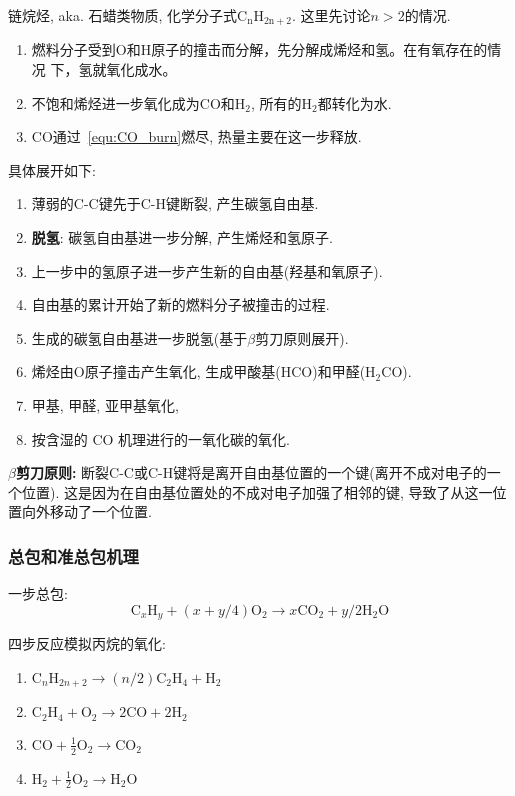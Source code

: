 链烷烃, aka. 石蜡类物质, 化学分子式\(\mathrm{C_n H_{2n+2}}\). 这里先讨论\(n>2\)的情况.
\begin{enumerate}
    \item  燃料分子受到O和H原子的撞击而分解，先分解成烯烃和氢。在有氧存在的情况
下，氢就氧化成水。
    \item 不饱和烯烃进一步氧化成为CO和\(\mathrm{H_2}\), 所有的\(\mathrm{H_2}\)都转化为水.
    \item CO通过~\ref{equ:CO_burn}燃尽, 热量主要在这一步释放.
\end{enumerate}

具体展开如下:
\begin{enumerate}
    \item 薄弱的C-C键先于C-H键断裂, 产生碳氢自由基.
    \item \textbf{脱氢}: 碳氢自由基进一步分解, 产生烯烃和氢原子.
    \item 上一步中的氢原子进一步产生新的自由基(羟基和氧原子).
    \item 自由基的累计开始了新的燃料分子被撞击的过程.
    \item 生成的碳氢自由基进一步脱氢(基于\(\beta\)剪刀原则展开).
    \item 烯烃由O原子撞击产生氧化, 生成甲酸基(HCO)和甲醛(H\(_2\)CO).
    \item 甲基, 甲醛, 亚甲基氧化,
    \item 按含湿的 CO 机理进行的一氧化碳的氧化.
\end{enumerate}

\textbf{\(\beta\)剪刀原则:} 断裂C-C或C-H键将是离开自由基位置的一个键(离开不成对电子的一个位置). 这是因为在自由基位置处的不成对电子加强了相邻的键, 导致了从这一位置向外移动了一个位置.

\subsubsection{总包和准总包机理}

一步总包:
\begin{equation}
    \mathrm{C}_x \mathrm{H}_y + (x+y/4)\mathrm{O_2} \to x\mathrm{CO_2} + y/2\mathrm{H_2O}
\end{equation}

四步反应模拟丙烷的氧化:
\begin{enumerate}
    \item \(\mathrm{C}_n \mathrm{H}_{2n+2} \to (n/2) \mathrm{C}_2 \mathrm{H}_4 + \mathrm{H}_2\)
    \item \(\mathrm{C}_2\mathrm{H}_4 + \mathrm{O}_2 \to 2\mathrm{CO} + 2 \mathrm{H}_2\)
    \item \(\mathrm{CO+\frac{1}{2}O_2\to CO_2}\)
    \item \(\mathrm{H_2 + \frac{1}{2}O_2\to H_2O}\)
\end{enumerate}

